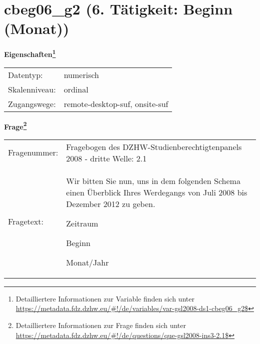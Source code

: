 
    \setcounter{footnote}{0}

    \vspace*{-1.8cm}
	\section{cbeg06\_g2 (6. Tätigkeit: Beginn (Monat))}
	\label{section:cbeg06_g2}



    \vspace*{0.5cm}
    \noindent\textbf{Eigenschaften\footnote{Detailliertere Informationen zur Variable finden sich unter
		\url{https://metadata.fdz.dzhw.eu/\#!/de/variables/var-gsl2008-ds1-cbeg06_g2$}}}\\
	\begin{tabularx}{\hsize}{@{}lX}
	Datentyp: & numerisch \\
	Skalenniveau: & ordinal \\
	Zugangswege: &
	  remote-desktop-suf, 
	  onsite-suf
 \\
    \end{tabularx}



				\vspace*{0.5cm}
                \noindent\textbf{Frage\footnote{Detailliertere Informationen zur Frage finden sich unter
		              \url{https://metadata.fdz.dzhw.eu/\#!/de/questions/que-gsl2008-ins3-2.1$}}}\\
				\begin{tabularx}{\hsize}{@{}lX}
					Fragenummer: &
					  Fragebogen des DZHW-Studienberechtigtenpanels 2008 - dritte Welle:
					  2.1
 \\
					Fragetext: & Wir bitten Sie nun, uns in dem folgenden Schema einen Überblick Ihres Werdegangs von Juli 2008 bis Dezember 2012 zu geben.\par  Zeitraum\par  Beginn\par  Monat/Jahr \\
				\end{tabularx}





